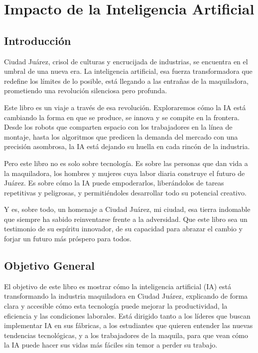 
\chapter{Impacto de la Inteligencia Artificial}

\section{Introducción}
Ciudad Juárez, crisol de culturas y encrucijada de industrias, se encuentra en el umbral de una nueva era. La inteligencia artificial, esa fuerza transformadora que redefine los límites de lo posible, está llegando a las entrañas de la maquiladora, prometiendo una revolución silenciosa pero profunda.

Este libro es un viaje a través de esa revolución. Exploraremos cómo la IA está cambiando la forma en que se produce, se innova y se compite en la frontera. Desde los robots que comparten espacio con los trabajadores en la línea de montaje, hasta los algoritmos que predicen la demanda del mercado con una precisión asombrosa, la IA está dejando su huella en cada rincón de la industria.

Pero este libro no es solo sobre tecnología. Es sobre las personas que dan vida a la maquiladora, los hombres y mujeres cuya labor diaria construye el futuro de Juárez. Es sobre cómo la IA puede empoderarlos, liberándolos de tareas repetitivas y peligrosas, y permitiéndoles desarrollar todo su potencial creativo.

Y es, sobre todo, un homenaje a Ciudad Juárez, mi ciudad, esa tierra indomable que siempre ha sabido reinventarse frente a la adversidad. Que este libro sea un testimonio de su espíritu innovador, de su capacidad para abrazar el cambio y forjar un futuro más próspero para todos.

\section{Objetivo General}
El objetivo de este libro es mostrar cómo la inteligencia artificial (IA) está transformando la industria maquiladora en Ciudad Juárez, explicando de forma clara y accesible cómo esta tecnología puede mejorar la productividad, la eficiencia y las condiciones laborales. Está dirigido tanto a los líderes que buscan implementar IA en sus fábricas, a los estudiantes que quieren entender las nuevas tendencias tecnológicas, y a los trabajadores de la maquila, para que vean cómo la IA puede hacer sus vidas más fáciles sin temor a perder su trabajo.

